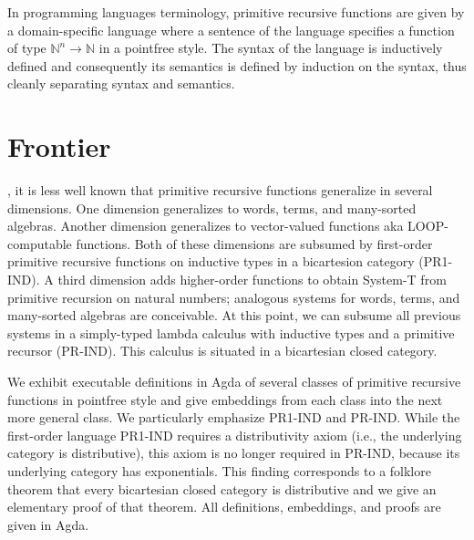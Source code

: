 \documentclass[a4paper,USenglish,cleveref, autoref, thm-restate]{lipics-v2021}
\begin{document}
In programming languages terminology, primitive
recursive functions are given by a domain-specific language where a
sentence of the language specifies a function of type ${ℕ}^n \to {ℕ}$
in a pointfree style. The syntax of the language is inductively
defined and consequently its semantics is defined by induction on the
syntax, thus cleanly separating syntax and semantics.


\section{Frontier}



, it is less well known that primitive recursive
functions generalize in several dimensions. One dimension generalizes
to words, terms, and many-sorted algebras. Another dimension
generalizes to vector-valued functions aka LOOP-computable
functions. Both of these dimensions are 
subsumed by first-order primitive recursive functions on inductive
types in a bicartesion category (PR1-IND). 
A third dimension adds higher-order functions to obtain System-T from
primitive recursion on natural numbers; analogous systems for
words, terms, and many-sorted algebras are conceivable. At this point, we can subsume
all previous systems in a simply-typed lambda calculus with
inductive types and a primitive recursor (PR-IND). This calculus is
situated in a bicartesian closed category.

We exhibit executable definitions in Agda of several classes of primitive
recursive functions in pointfree style and give embeddings from each
class into the next more general class. We particularly emphasize
PR1-IND and PR-IND.
While the first-order language PR1-IND requires a distributivity axiom
(i.e., the underlying category is distributive), this axiom is no
longer required in PR-IND, because its underlying category has
exponentials.
This finding corresponds to a folklore theorem that every bicartesian
closed category is distributive and we give an elementary proof of
that theorem.
All definitions, embeddings, and proofs are given in Agda.





\end{document}
